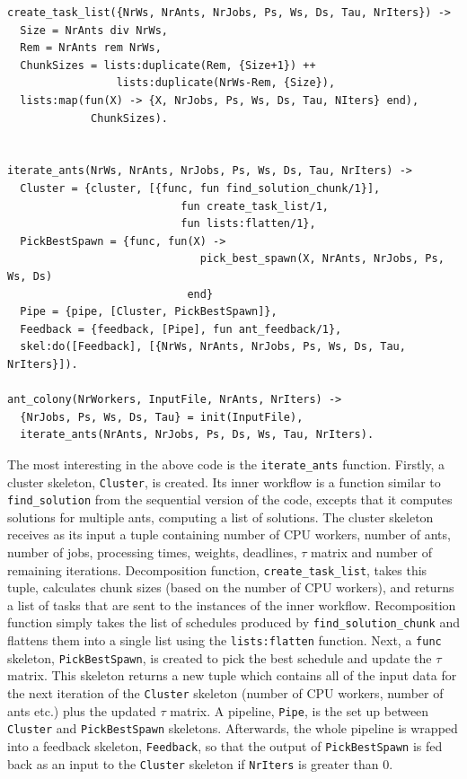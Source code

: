 \documentclass[final]{jfp1}
\begin{document}
\begin{lstlisting}
create_task_list({NrWs, NrAnts, NrJobs, Ps, Ws, Ds, Tau, NrIters}) ->
  Size = NrAnts div NrWs,
  Rem = NrAnts rem NrWs,
  ChunkSizes = lists:duplicate(Rem, {Size+1}) ++
                 lists:duplicate(NrWs-Rem, {Size}),
  lists:map(fun(X) -> {X, NrJobs, Ps, Ws, Ds, Tau, NIters} end),
             ChunkSizes).


iterate_ants(NrWs, NrAnts, NrJobs, Ps, Ws, Ds, Tau, NrIters) ->
  Cluster = {cluster, [{func, fun find_solution_chunk/1}],
                           fun create_task_list/1,
                           fun lists:flatten/1},
  PickBestSpawn = {func, fun(X) ->
                              pick_best_spawn(X, NrAnts, NrJobs, Ps, Ws, Ds)
                            end}
  Pipe = {pipe, [Cluster, PickBestSpawn]},
  Feedback = {feedback, [Pipe], fun ant_feedback/1},
  skel:do([Feedback], [{NrWs, NrAnts, NrJobs, Ps, Ws, Ds, Tau, NrIters}]).
    
ant_colony(NrWorkers, InputFile, NrAnts, NrIters) ->
  {NrJobs, Ps, Ws, Ds, Tau} = init(InputFile),
  iterate_ants(NrAnts, NrJobs, Ps, Ds, Ws, Tau, NrIters).
\end{lstlisting}

\noindent
The most interesting in the above code is the \lstinline{iterate_ants}
function. Firstly, a cluster skeleton, \lstinline{Cluster}, is created.
Its inner workflow is a function similar to \lstinline{find_solution}
from the sequential version of the code, excepts that it computes solutions
for multiple ants, computing a list of solutions. The cluster skeleton
receives as its input a tuple containing number of CPU workers, number
of ants, number of jobs, processing times, weights, deadlines, $\tau$
matrix and number of remaining iterations. Decomposition function,
\lstinline{create_task_list}, takes this tuple, calculates chunk sizes
(based on the number of CPU workers), and returns a list of tasks that
are sent to the instances of the inner workflow. Recomposition function simply
takes the list of schedules produced by \lstinline{find_solution_chunk} and
flattens them into a single list using the \lstinline{lists:flatten}
function. Next, a \lstinline{func} skeleton, \lstinline{PickBestSpawn},
is created to pick the best schedule and update the $\tau$ matrix. This
skeleton returns a new tuple which contains all of the input data for
the next iteration of the \lstinline{Cluster} skeleton (number of
CPU workers, number of ants etc.) plus the updated $\tau$ matrix.
A pipeline, \lstinline{Pipe}, is the set up between \lstinline{Cluster}
and \lstinline{PickBestSpawn} skeletons. Afterwards, the whole pipeline
is wrapped into a feedback skeleton, \lstinline{Feedback}, so that
the output of \lstinline{PickBestSpawn} is fed back as an input to
the \lstinline{Cluster} skeleton if \lstinline{NrIters} is greater than
0.
\end{document}
